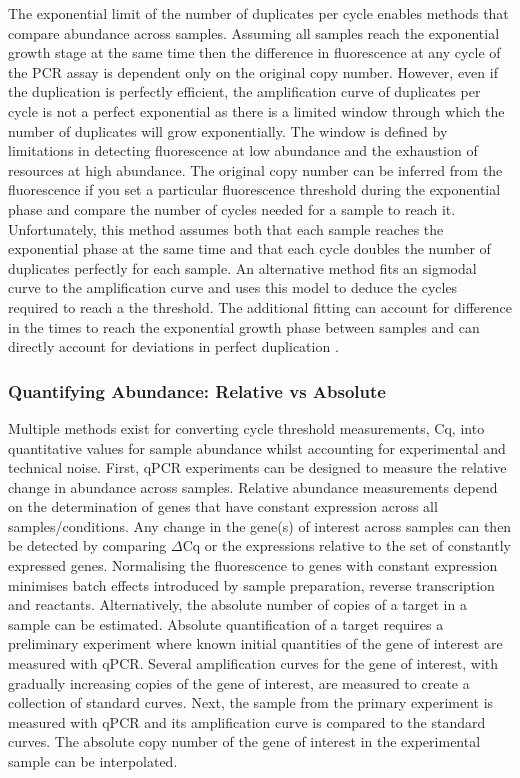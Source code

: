 \documentclass[../main.tex]{subfiles}
\begin{document}
The exponential limit of the number of duplicates per cycle enables methods that compare abundance across samples. 
Assuming all samples reach the exponential growth stage at the same time then the difference in fluorescence at any cycle of the PCR assay is dependent only on the original copy number. 
However, even if the duplication is perfectly efficient, the amplification curve of duplicates per cycle is not a perfect exponential as there is a limited window through which the number of duplicates will grow exponentially.
The window is defined by limitations in detecting fluorescence at low abundance and the exhaustion of resources at high abundance.
The original copy number can be inferred from the fluorescence if you set a particular fluorescence threshold during the exponential phase and compare the number of cycles needed for a sample to reach it.
Unfortunately, this method assumes both that each sample reaches the exponential phase at the same time and that each cycle doubles the number of duplicates perfectly for each sample. 
An alternative method fits an sigmodal curve to the amplification curve and uses this model to deduce the cycles required to reach a the threshold.
The additional fitting can account for difference in the times to reach the exponential growth phase between samples and can directly account for deviations in perfect duplication \parencite{Swillens2008}. 

\subsubsection{Quantifying Abundance: Relative vs Absolute}

Multiple methods exist for converting cycle threshold measurements, Cq, into quantitative values for sample abundance whilst accounting for experimental and technical noise.
First, qPCR experiments can be designed to measure the relative change in abundance across samples.
Relative abundance measurements depend on the determination of genes that have constant expression across all samples/conditions.
Any change in the gene(s) of interest across samples can then be detected by comparing $\Delta$Cq or the expressions relative to the set of constantly expressed genes.
Normalising the fluorescence to genes with constant expression minimises batch effects introduced by sample preparation, reverse transcription and reactants.
Alternatively, the absolute number of copies of a target in a sample can be estimated.
Absolute quantification of a target requires a preliminary experiment where known initial quantities of the gene of interest are measured with qPCR.
Several amplification curves for the gene of interest, with gradually increasing copies of the gene of interest, are measured to create a collection of standard curves.
Next, the sample from the primary experiment is measured with qPCR and its amplification curve is compared to the standard curves.
The absolute copy number of the gene of interest in the experimental sample can be interpolated.
\end{document}
